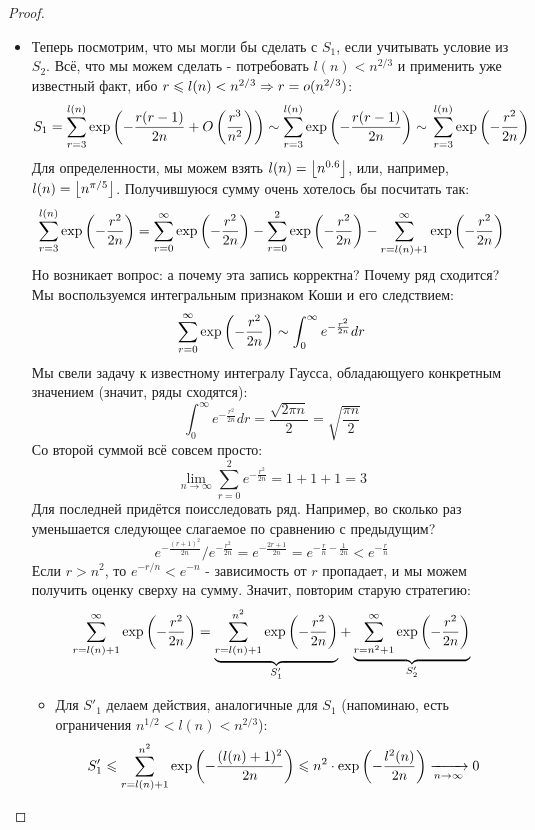 \begin{proof}
\begin{itemize}
		\item Теперь посмотрим, что мы могли бы сделать с $S_1$, если учитывать условие из $S_2$. Всё, что мы можем сделать - потребовать $l(n) < n^{2/3}$ и применить уже известный факт, ибо $r \leqslant l(n) < n^{2/3} \Rightarrow r = o(n^{2/3})$:
		\[
			S_1 = \sum_{r = 3}^{l(n)} \exp\left( -\frac{r(r - 1)}{2n} + O\left( \frac{r^3}{n^2} \right) \right) \sim \sum_{r = 3}^{l(n)} \exp\left( -\frac{r(r - 1)}{2n} \right) \sim
			\\
			\sum_{r = 3}^{l(n)} \exp\left( -\frac{r^2}{2n} \right)
		\]
		Для определенности, мы можем взять $l(n) = \left\lfloor n^{0.6} \right\rfloor$, или, например, $l(n) = \left\lfloor n^{\pi / 5} \right\rfloor$. Получившуюся сумму очень хотелось бы посчитать так:
		\[
			\sum_{r = 3}^{l(n)} \exp\left( -\frac{r^2}{2n} \right) = \sum_{r = 0}^\infty \exp\left( -\frac{r^2}{2n} \right) - \sum_{r = 0}^2 \exp\left( -\frac{r^2}{2n} \right) - \sum_{r = l(n) + 1}^\infty \exp\left( -\frac{r^2}{2n} \right)
		\]
		Но возникает вопрос: а почему эта запись корректна? Почему ряд сходится? Мы воспользуемся интегральным признаком Коши и его следствием:
		\[
			\sum_{r = 0}^\infty \exp\left( -\frac{r^2}{2n} \right) \sim \int_0^\infty e^{-\frac{r^2}{2n}}dr
		\]
		Мы свели задачу к известному интегралу Гаусса, обладающуего конкретным значением (значит, ряды сходятся):
		\[
			\int_0^\infty e^{-\frac{r^2}{2n}}dr = \frac{\sqrt{2\pi n}}{2} = \sqrt{\frac{\pi n}{2}}
		\]
		Со второй суммой всё совсем просто:
		\[
			\lim_{n \to \infty} \sum_{r = 0}^2 e^{-\frac{r^2}{2n}} = 1 + 1 + 1 = 3
		\]
		Для последней придётся поисследовать ряд. Например, во сколько раз уменьшается следующее слагаемое по сравнению с предыдущим?
		\[
			e^{-\frac{(r + 1)^2}{2n}} / e^{-\frac{r^2}{2n}} = e^{-\frac{2r + 1}{2n}} = e^{-\frac{r}{n} - \frac{1}{2n}} < e^{-\frac{r}{n}}
		\]
		Если $r > n^2$, то $e^{-r/n} < e^{-n}$ - зависимость от $r$ пропадает, и мы можем получить оценку сверху на сумму. Значит, повторим старую стратегию:
		\[
			\sum_{r = l(n) + 1}^\infty \exp\left( -\frac{r^2}{2n} \right) = \underbrace{\sum_{r = l(n) + 1}^{n^2} \exp\left( -\frac{r^2}{2n} \right)}_{S'_1} + \underbrace{\sum_{r = n^2 + 1}^\infty \exp\left( -\frac{r^2}{2n} \right)}_{S'_2}
		\]
		\begin{itemize}
			\item Для $S'_1$ делаем действия, аналогичные для $S_1$ (напоминаю, есть ограничения $n^{1/2} < l(n) < n^{2/3}$):
			\[
				S'_1 \leqslant \sum_{r = l(n) + 1}^{n^2} \exp\left( -\frac{(l(n) + 1)^2}{2n} \right) \leqslant n^2 \cdot \exp\left( -\frac{l^2(n)}{2n} \right) \xrightarrow[n \to \infty]{} 0
			\]
			

\end{itemize}
\end{itemize}
\end{proof}

